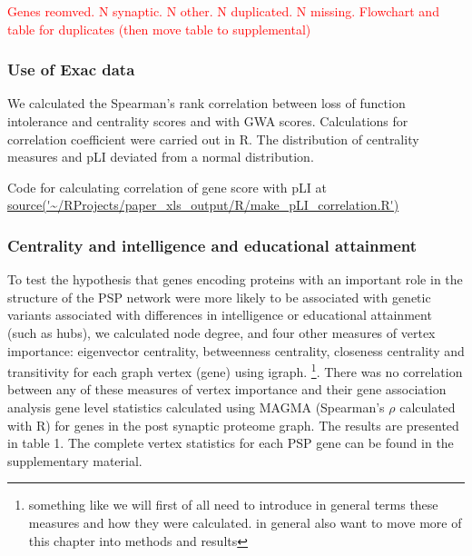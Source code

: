 




 \textcolor{red}{ Genes reomved. N synaptic. N other. N duplicated. N missing. Flowchart and table for duplicates (then move table to supplemental)}

\subsubsection{Use of Exac data}

We calculated the Spearman's rank correlation between loss of function intolerance and centrality scores and with GWA scores. Calculations for correlation coefficient were carried out in R. The distribution of centrality measures and pLI deviated from a normal distribution. 


Code for calculating correlation of gene score with pLI at \url{source('~/RProjects/paper_xls_output/R/make_pLI_correlation.R')}

\subsubsection{Centrality and intelligence and educational attainment}
\label{sec:centrality and intelligence and education cohort}
To test the hypothesis that genes encoding proteins with an important role in the structure of the PSP network were more likely to be associated with genetic variants associated with differences in intelligence or educational attainment (such as hubs), we calculated node degree, and four other measures of vertex importance: eigenvector centrality, betweenness centrality, closeness centrality and transitivity for each graph vertex (gene) using igraph. \cite{csardi2006igraph}\footnote{something like we will first of all need to introduce in general terms these measures and how they were calculated. in general also want to move more of this chapter into methods and results}. There was no correlation between any of these measures of vertex importance and their gene association analysis gene level statistics calculated using MAGMA (Spearman’s $\rho$ calculated with R) for genes in the post synaptic proteome graph. The results are presented in table 1. The complete vertex statistics for each PSP gene can be found in the supplementary material. 


